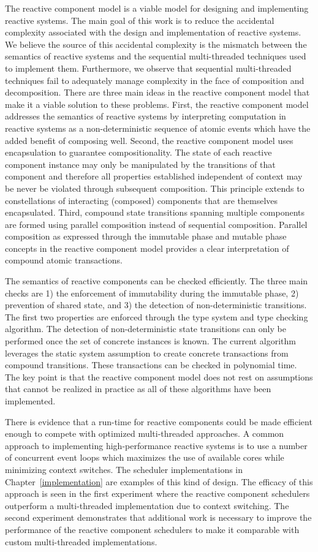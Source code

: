 The reactive component model is a viable model for designing and implementing reactive systems.
The main goal of this work is to reduce the accidental complexity associated with the design and implementation of reactive systems.
We believe the source of this accidental complexity is the mismatch between the semantics of reactive systems and the sequential multi-threaded techniques used to implement them.
Furthermore, we observe that sequential multi-threaded techniques fail to adequately manage complexity in the face of composition and decomposition.
There are three main ideas in the reactive component model that make it a viable solution to these problems.
First, the reactive component model addresses the semantics of reactive systems by interpreting computation in reactive systems as a non-deterministic sequence of atomic events which have the added benefit of composing well.
Second, the reactive component model uses encapsulation to guarantee compositionality.
The state of each reactive component instance may only be manipulated by the transitions of that component and therefore all properties established independent of context may be never be violated through subsequent composition.
This principle extends to constellations of interacting (composed) components that are themselves encapsulated.
Third, compound state transitions spanning multiple components are formed using parallel composition instead of sequential composition.
Parallel composition as expressed through the immutable phase and mutable phase concepts in the reactive component model provides a clear interpretation of compound atomic transactions.

The semantics of reactive components can be checked efficiently.
The three main checks are 1) the enforcement of immutability during the immutable phase, 2) prevention of shared state, and 3) the detection of non-deterministic transitions.
The first two properties are enforced through the type system and type checking algorithm.
The detection of non-deterministic state transitions can only be performed once the set of concrete instances is known.
The current algorithm leverages the static system assumption to create concrete transactions from compound transitions.
These transactions can be checked in polynomial time.
The key point is that the reactive component model does not rest on assumptions that cannot be realized in practice as all of these algorithms have been implemented.

There is evidence that a run-time for reactive components could be made efficient enough to compete with optimized multi-threaded approaches.
A common approach to implementing high-performance reactive systems is to use a number of concurrent event loops which maximizes the use of available cores while minimizing context switches.
The scheduler implementations in Chapter~\ref{implementation} are examples of this kind of design.
The efficacy of this approach is seen in the first experiment where the reactive component schedulers outperform a multi-threaded implementation due to context switching.
The second experiment demonstrates that additional work is necessary to improve the performance of the reactive component schedulers to make it comparable with custom multi-threaded implementations.

